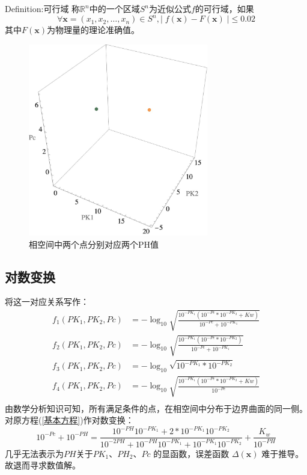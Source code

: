 \documentclass[UTF-8]{ctexart}
\newcommand{\R}{\mathbb{R}}
\newcommand{\0}{\boldsymbol{0}}
\begin{document}
\begin{definition}{Definition:可行域}
    \kaishu \fontsize{11pt}{16pt}
    称$\R^n$中的一个区域$S^n$为近似公式$f$的可行域，如果
    \[
        \forall \bm{x} = (x_1,x_2,\dots,x_n) \in S^n, |\;f(\bm{x})-F(\bm{x})\;|\leq0.02 
    \]
    其中$F(\bm{x})$为物理量的理论准确值。
\end{definition}

\vspace{0.02\textheight} 

\begin{figure}[ht]
    \centering
    \includegraphics[width=0.7\textwidth]{映射.jpg}
    \caption{\kaishu 相空间中两个点分别对应两个PH值}
    \label{fig:映射}
\end{figure}

\subsection{对数变换}
将这一对应关系写作：
\begin{align*}    
    f_1(PK_1, PK_2, Pc)&=-\log_{10} \sqrt{     \frac{10^{-PK_1}(10^{-Pc} *10^{-PK_2}+Kw)}  {10^{-Pc}+10^{-PK_1}} } \\
    f_2(PK_1, PK_2, Pc)&= -\log_{10} \sqrt{     \frac{10^{-PK_1}(10^{-Pc} *10^{-PK_2})}  {10^{-Pc}+10^{-PK_1}} } \\
    f_3(PK_1,PK_2,Pc)&=-\log_{10} \sqrt{     10^{-PK_1}*10^{-PK_2} }\\  
    f_4(PK_1,PK_2,Pc)&=-\log_{10} \sqrt{     \frac{10^{-PK_1}(10^{-Pc} *10^{-PK_2}+Kw)}  {10^{-Pc}} }\\ 
\end{align*}
由数学分析知识可知，所有满足条件的点，在相空间中分布于边界曲面的同一侧。对原方程(\ref{基本方程})作对数变换：
\begin{equation} \label{对数变换}
    10^{-Pc}+10^{-PH}= \frac{10^{-PH}10^{-PK_1}+2*10^{-PK_1}10^{-PK_2}} {10^{-2PH}+10^{-PH}10^{-PK_1}+10^{-PK_1}10^{-PK_2}} +\frac{K_w}{10^{-PH}} 
\end{equation}
几乎无法表示为$ PH $关于$ PK_1$、$PH_2$、$Pc$ 的显函数，误差函数 $\Delta (\bm{x})$ 难于推导。故退而寻求数值解。
\end{document}
